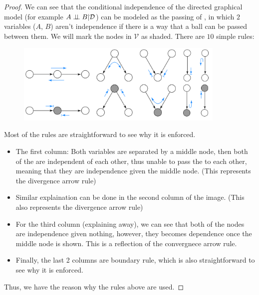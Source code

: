 \begin{proof}
    We can see that the conditional independence of the directed graphical model (for example $A\perp \!\!\! \perp B | \mathcal{D}$) can be modeled as the passing of , in which $2$ variables ($A$, $B$) aren't independence if there is a way that a ball can be passed between them. We will mark the nodes in $\mathcal{V}$ as shaded. There are $10$ simple rules:
    \begin{figure}[H]
        \centering
        \includegraphics[width=10cm]{img/img3.png}
    \end{figure}  
    Most of the rules are straightforward to see why it is enforced. 
    \begin{itemize}
        \item The first column: Both variables are separated by a middle node, then both of the are independent of each other, thus unable to pass the  to each other, meaning that they are independence given the middle node. (This represents the divergence arrow rule)
        \item Similar explaination can be done in the second column of the image. (This also represents the divergence arrow rule)
        \item For the third column (explaining away), we can see that both of the nodes are independence given nothing, however, they becomes dependence once the middle node is shown. This is a reflection of the convergnece arrow rule. 
        \item Finally, the last 2 columns are boundary rule, which is also straightforward to see why it is enforced.
    \end{itemize}
    Thus, we have the reason why the rules above are used. 
\end{proof}


